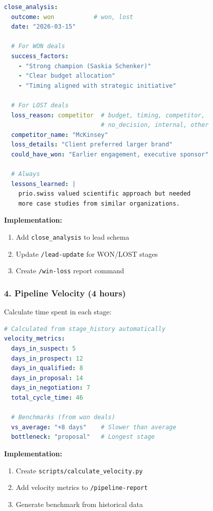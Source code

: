 \begin{lstlisting}[language=yaml,basicstyle=\ttfamily\small]
close_analysis:
  outcome: won           # won, lost
  date: "2026-03-15"

  # For WON deals
  success_factors:
    - "Strong champion (Saskia Schenker)"
    - "Clear budget allocation"
    - "Timing aligned with strategic initiative"

  # For LOST deals
  loss_reason: competitor  # budget, timing, competitor,
                           # no_decision, internal, other
  competitor_name: "McKinsey"
  loss_details: "Client preferred larger brand"
  could_have_won: "Earlier engagement, executive sponsor"

  # Always
  lessons_learned: |
    prio.swiss valued scientific approach but needed
    more case studies from similar organizations.
\end{lstlisting}

\textbf{Implementation:}
\begin{enumerate}[nosep]
    \item Add \texttt{close\_analysis} to lead schema
    \item Update \texttt{/lead-update} for WON/LOST stages
    \item Create \texttt{/win-loss} report command
\end{enumerate}

\subsubsection{4. Pipeline Velocity (4 hours)}

Calculate time spent in each stage:

\begin{lstlisting}[language=yaml,basicstyle=\ttfamily\small]
# Calculated from stage_history automatically
velocity_metrics:
  days_in_suspect: 5
  days_in_prospect: 12
  days_in_qualified: 8
  days_in_proposal: 14
  days_in_negotiation: 7
  total_cycle_time: 46

  # Benchmarks (from won deals)
  vs_average: "+8 days"    # Slower than average
  bottleneck: "proposal"   # Longest stage
\end{lstlisting}

\textbf{Implementation:}
\begin{enumerate}[nosep]
    \item Create \texttt{scripts/calculate\_velocity.py}
    \item Add velocity metrics to \texttt{/pipeline-report}
    \item Generate benchmark from historical data
\end{enumerate}


